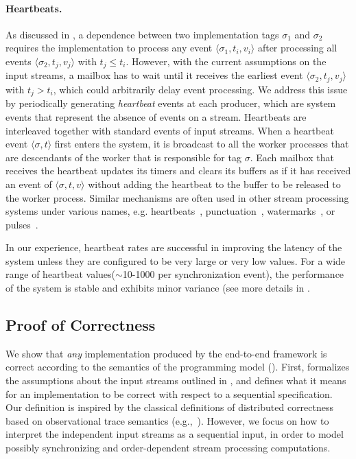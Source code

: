 \paragraph{Heartbeats.}
\label{dgs:ssec:heartbeats}
As discussed in , a dependence
between two implementation tags $\sigma_1$ and $\sigma_2$ requires the
implementation to process any event $\langle \sigma_1, t_i, v_i
\rangle$ after processing all events $\langle \sigma_2, t_j, v_j
\rangle$ with $t_j \leq t_i$. However, with the current assumptions on
the input streams, a mailbox has to wait until it receives the
earliest event $\langle \sigma_2, t_j, v_j \rangle$ with $t_j > t_i$,
which could arbitrarily delay event processing. We address this issue
by periodically generating
\emph{heartbeat} events
at each producer,
which are system events that represent
the absence of events on a stream.
Heartbeats are interleaved together with standard events of input streams.
When a heartbeat event $\langle \sigma, t \rangle$ first enters the system,
  it is broadcast to all the worker processes that are descendants of the worker that is responsible for tag $\sigma$.
Each mailbox that receives the heartbeat updates its timers and clears its buffers
  as if it has received an event of $\langle \sigma, t, v \rangle$ without adding the heartbeat to the buffer to be released to the worker process.
Similar mechanisms are often used in other stream processing systems under various names,
  e.g. heartbeats~\cite{heartbeats2005},
  punctuation~\cite{punctuation2003},
  watermarks~\cite{Flink2015}, or
  pulses~\cite{schneider2013safe}.

In our experience, heartbeat rates are successful in improving the latency of the system unless they are configured to be very large or very low values. For a wide range of heartbeat values($\sim$10-1000 per synchronization event), the performance of the system is stable and exhibits minor variance (see more details in .

\subsection{Proof of Correctness}
\label{dgs:ssec:proof-of-correctness}

We show that \emph{any} implementation produced by the end-to-end
framework is correct according to the semantics of the programming model ().
First,  formalizes the
assumptions about the input streams outlined in
, and 
defines what it means for an implementation to be correct with respect
to a sequential specification.
Our definition is inspired by the
classical definitions of distributed correctness based on
observational trace semantics (e.g.,~\cite{lynch1996distributed}).
However, we focus on how to interpret the independent input streams as
a sequential input, in order to model possibly synchronizing and
order-dependent stream processing computations.


